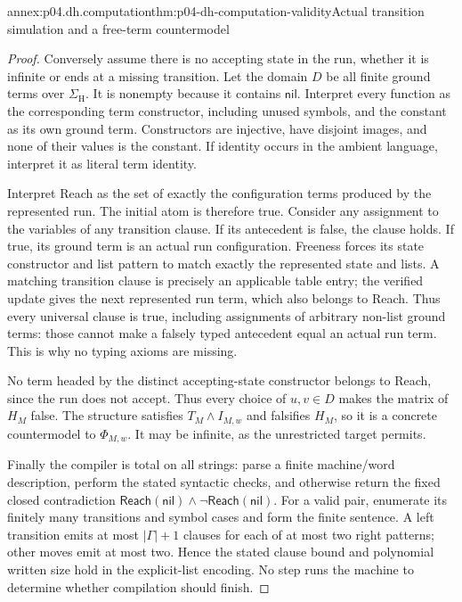 \begin{annexitem}{annex:p04.dh.computation}{thm:p04-dh-computation-validity}{Actual transition simulation and a free-term countermodel}
\begin{proof}
Conversely assume there is no accepting state in the run, whether it is
infinite or ends at a missing transition. Let the domain \(D\) be all
finite ground terms over \(\Sigma_{\mathrm H}\). It is nonempty because
it contains \(\mathsf{nil}\). Interpret every function as the corresponding
term constructor, including unused symbols, and the constant as its
own ground term. Constructors are injective, have disjoint images, and
none of their values is the constant. If identity occurs in the ambient
language, interpret it as literal term identity.

Interpret Reach as the set of exactly the configuration terms produced
by the represented run. The initial atom is therefore true. Consider
any assignment to the variables of any transition clause. If its
antecedent is false, the clause holds. If true, its ground term is an
actual run configuration. Freeness forces its state constructor and
list pattern to match exactly the represented state and lists. A matching
transition clause is precisely an applicable table entry; the verified
update gives the next represented run term, which also belongs to Reach.
Thus every universal clause is true, including assignments of arbitrary
non-list ground terms: those cannot make a falsely typed antecedent
equal an actual run term. This is why no typing axioms are missing.

No term headed by the distinct accepting-state constructor belongs to
Reach, since the run does not accept. Thus every choice of \(u,v\in D\)
makes the matrix of \(H_M\) false. The structure satisfies
\(T_M\land I_{M,w}\) and falsifies \(H_M\), so it is a concrete countermodel
to \(\Phi_{M,w}\). It may be infinite, as the unrestricted target permits.

Finally the compiler is total on all strings: parse a finite machine/word
description, perform the stated syntactic checks, and otherwise return
the fixed closed contradiction
\(\mathsf{Reach}(\mathsf{nil})\land\neg\mathsf{Reach}(\mathsf{nil})\).
For a valid pair, enumerate its finitely many transitions and symbol
cases and form the finite sentence. A left transition emits at most
\(|\Gamma|+1\) clauses for each of at most two right patterns; other
moves emit at most two. Hence the stated clause bound and polynomial
written size hold in the explicit-list encoding. No step runs the
machine to determine whether compilation should finish.
\end{proof}
\end{annexitem}

